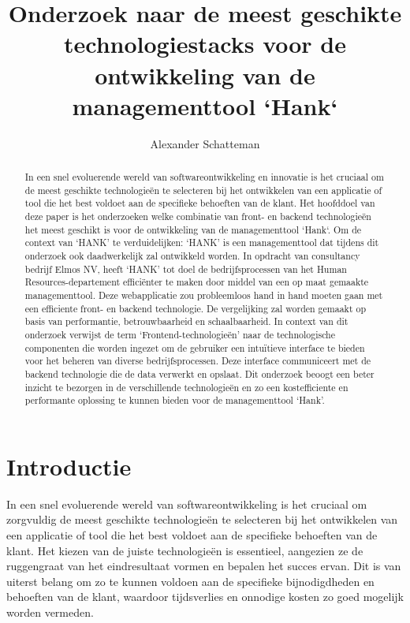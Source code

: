 \documentclass{hogent-article}
\title{Onderzoek naar de meest geschikte technologiestacks voor de ontwikkeling van de managementtool `Hank`}
\author{Alexander Schatteman}
\begin{document}
\begin{abstract}
    In een snel evoluerende wereld van softwareontwikkeling en innovatie is het cruciaal om de meest geschikte technologieën te selecteren bij het ontwikkelen van een applicatie of tool die het best voldoet aan de specifieke behoeften van de klant.
    \bigskip
    Het hoofddoel van deze paper is het onderzoeken welke combinatie van front- en backend technologieën het meest geschikt is voor de ontwikkeling van de managementtool `Hank`.
    \bigskip
    Om de context van `HANK' te verduidelijken: `HANK' is een managementtool dat tijdens dit onderzoek ook daadwerkelijk zal ontwikkeld worden. In opdracht van consultancy bedrijf Elmos NV, heeft `HANK' tot doel de bedrijfsprocessen van het Human Resources-departement efficiënter te maken door middel van een op maat gemaakte managementtool. Deze webapplicatie zou probleemloos hand in hand moeten gaan met een efficiente front- en backend technologie. 
    \bigskip
    De vergelijking zal worden gemaakt op basis van performantie, betrouwbaarheid en schaalbaarheid. In context van dit onderzoek verwijst de term `Frontend-technologieën' naar de technologische componenten die worden ingezet om de gebruiker een intuïtieve interface te bieden voor het beheren van diverse bedrijfsprocessen. Deze interface communiceert met de backend technologie die de data verwerkt en opslaat. 
    \bigskip
    Dit onderzoek beoogt een beter inzicht te bezorgen in de verschillende technologieën en zo een kostefficiente en performante oplossing te kunnen bieden voor de managementtool `Hank'.
\end{abstract}

\tableofcontents
\section{Introductie}%
\label{sec:introductie}
  In een snel evoluerende wereld van softwareontwikkeling is het cruciaal om zorgvuldig de meest geschikte technologieën te selecteren bij het ontwikkelen van een applicatie of tool die het best voldoet aan de specifieke behoeften van de klant.
  Het kiezen van de juiste technologieën is essentieel, aangezien ze de ruggengraat van het eindresultaat vormen en bepalen het succes ervan. Dit is van uiterst belang om zo te kunnen voldoen aan de specifieke bijnodigdheden en behoeften van de klant, waardoor tijdsverlies en onnodige kosten zo goed mogelijk worden vermeden. 
  
\end{document}
